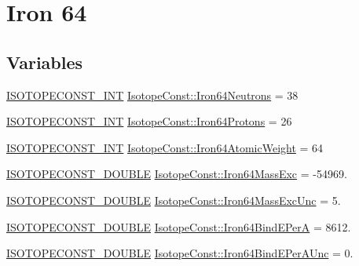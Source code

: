 \hypertarget{group___isotope_const-_iron-_fe64}{}\section{Iron 64}
\label{group___isotope_const-_iron-_fe64}
\subsection*{Variables}
\begin{DoxyCompactItemize}
\item 
\mbox{\hyperlink{group___isotope_const-_macros_ga5f18360b3e99483a35c32d789e62621c}{I\+S\+O\+T\+O\+P\+E\+C\+O\+N\+S\+T\+\_\+\+I\+NT}} \mbox{\hyperlink{group___isotope_const-_iron-_fe64_gabe3bfaceb606db2d3244398da8341bab}{Isotope\+Const\+::\+Iron64\+Neutrons}} = 38
\item 
\mbox{\hyperlink{group___isotope_const-_macros_ga5f18360b3e99483a35c32d789e62621c}{I\+S\+O\+T\+O\+P\+E\+C\+O\+N\+S\+T\+\_\+\+I\+NT}} \mbox{\hyperlink{group___isotope_const-_iron-_fe64_ga78a9397299e6dfc43f0709b3b15f4ddc}{Isotope\+Const\+::\+Iron64\+Protons}} = 26
\item 
\mbox{\hyperlink{group___isotope_const-_macros_ga5f18360b3e99483a35c32d789e62621c}{I\+S\+O\+T\+O\+P\+E\+C\+O\+N\+S\+T\+\_\+\+I\+NT}} \mbox{\hyperlink{group___isotope_const-_iron-_fe64_gaeb152e67010172fc44d7489494beac1a}{Isotope\+Const\+::\+Iron64\+Atomic\+Weight}} = 64
\item 
\mbox{\hyperlink{group___isotope_const-_macros_ga8f45a7272ce02c0b4c65c44636ed719a}{I\+S\+O\+T\+O\+P\+E\+C\+O\+N\+S\+T\+\_\+\+D\+O\+U\+B\+LE}} \mbox{\hyperlink{group___isotope_const-_iron-_fe64_ga1085222669e922c6c41ce0514979c164}{Isotope\+Const\+::\+Iron64\+Mass\+Exc}} = -\/54969.
\item 
\mbox{\hyperlink{group___isotope_const-_macros_ga8f45a7272ce02c0b4c65c44636ed719a}{I\+S\+O\+T\+O\+P\+E\+C\+O\+N\+S\+T\+\_\+\+D\+O\+U\+B\+LE}} \mbox{\hyperlink{group___isotope_const-_iron-_fe64_ga517002bd666c0d952ed9d51ee1effeff}{Isotope\+Const\+::\+Iron64\+Mass\+Exc\+Unc}} = 5.
\item 
\mbox{\hyperlink{group___isotope_const-_macros_ga8f45a7272ce02c0b4c65c44636ed719a}{I\+S\+O\+T\+O\+P\+E\+C\+O\+N\+S\+T\+\_\+\+D\+O\+U\+B\+LE}} \mbox{\hyperlink{group___isotope_const-_iron-_fe64_gae41667ae974d2ad171c7700c305d3636}{Isotope\+Const\+::\+Iron64\+Bind\+E\+PerA}} = 8612.
\item 
\mbox{\hyperlink{group___isotope_const-_macros_ga8f45a7272ce02c0b4c65c44636ed719a}{I\+S\+O\+T\+O\+P\+E\+C\+O\+N\+S\+T\+\_\+\+D\+O\+U\+B\+LE}} \mbox{\hyperlink{group___isotope_const-_iron-_fe64_gaf0c3d8abed04cca3c67e25bb6b57a8b9}{Isotope\+Const\+::\+Iron64\+Bind\+E\+Per\+A\+Unc}} = 0.

\end{DoxyCompactItemize}
